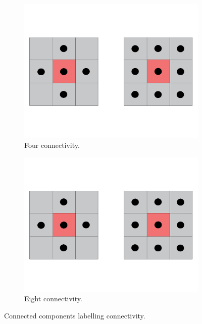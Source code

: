 \begin{figure}[h]
    \centering
    \begin{subfigure}[b]{0.3\textwidth}
        \centering
        \includegraphics[width=0.6\linewidth]{figures/detection/4_pixel_connectivity.pdf}
        \caption{Four connectivity.}
        \label{fig:four_connectivity}
    \end{subfigure}
    \quad
    \begin{subfigure}[b]{0.3\textwidth}
        \centering
        \includegraphics[width=0.6\linewidth]{figures/detection/8_pixel_connectivity.pdf}
        \caption{Eight connectivity.}
        \label{fig:eight_connectivity}
    \end{subfigure}
    \caption{Connected components labelling connectivity.}
    \label{fig:ccl_connectivity}
\end{figure}

